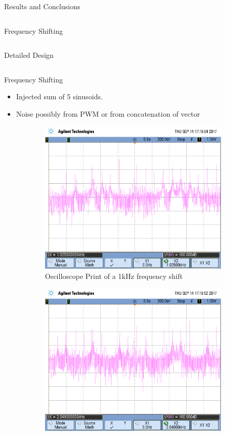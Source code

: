 \begin{frame}{Results and Conclusions}
\begin{columns}
\begin{block}{Frequency Shifting}
{					}
				\end{block}
	\end{columns}
\end{frame}

\begin{frame}{Detailed Design}
\begin{columns}
	\begin{block}{Frequency Shifting}
		\begin{itemize}
			\item Injected sum of 5 sinusoids. 
			\item Noise possibly from PWM or from concatenation of vector
		\end{itemize}
		\begin{figure}[h!]
			\centering
			\begin{subfigure}{0.48\linewidth}
				\centering
				\includegraphics[width=.9\linewidth]{images/scope_3}
				\caption{Oscilloscope Print of a 1kHz frequency shift }
				\label{fig:1khz}
			\end{subfigure}%
			\begin{subfigure}{0.48\linewidth}
				\centering
				\includegraphics[width=.9\linewidth]{images/scope_4}

\end{subfigure}
\end{figure}
\end{block}
\end{columns}
\end{frame}
